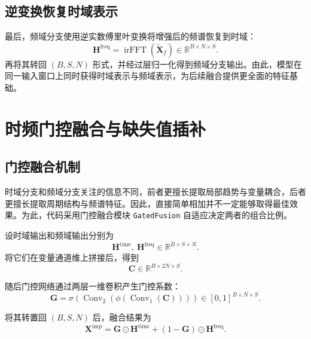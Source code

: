\subsection{逆变换恢复时域表示}

最后，频域分支使用逆实数傅里叶变换将增强后的频谱恢复到时域：
\begin{equation}
    \mathbf{H}^{\mathrm{freq}}
    =
    \operatorname{irFFT}(\tilde{\mathbf{X}}_f)
    \in \mathbb{R}^{B \times N \times S}.
\end{equation}
再将其转回 $(B,S,N)$ 形式，并经过层归一化得到频域分支输出。由此，模型在同一输入窗口上同时获得时域表示与频域表示，为后续融合提供更全面的特征基础。

\section{时频门控融合与缺失值插补}

\subsection{门控融合机制}

时域分支和频域分支关注的信息不同，前者更擅长提取局部趋势与变量耦合，后者更擅长提取周期结构与频谱特征。因此，直接简单相加并不一定能够取得最佳效果。为此，代码采用门控融合模块 \texttt{GatedFusion} 自适应决定两者的组合比例。

设时域输出和频域输出分别为
\begin{equation}
    \mathbf{H}^{\mathrm{time}},\ \mathbf{H}^{\mathrm{freq}} \in \mathbb{R}^{B \times S \times N}.
\end{equation}
将它们在变量通道维上拼接后，得到
\begin{equation}
    \mathbf{C} \in \mathbb{R}^{B \times 2N \times S}.
\end{equation}

随后门控网络通过两层一维卷积产生门控系数：
\begin{equation}
    \mathbf{G}
    =
    \sigma\!\left(
        \operatorname{Conv}_2(
            \phi(\operatorname{Conv}_1(\mathbf{C}))
        )
    \right)
    \in [0,1]^{B \times N \times S}.
\end{equation}

将其转置回 $(B,S,N)$ 后，融合结果为
\begin{equation}
    \mathbf{X}^{\mathrm{imp}}
    =
    \mathbf{G} \odot \mathbf{H}^{\mathrm{time}}
    + (1-\mathbf{G}) \odot \mathbf{H}^{\mathrm{freq}}.
\end{equation}

